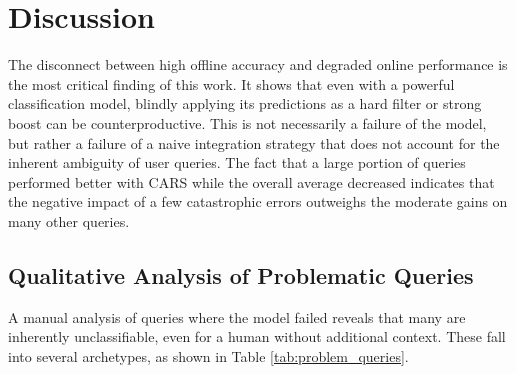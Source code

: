 \documentclass[12pt, a4paper]{article}
\begin{document}
\section{Discussion}

The disconnect between high offline accuracy and degraded online performance is the most critical finding of this work. It shows that even with a powerful classification model, blindly applying its predictions as a hard filter or strong boost can be counterproductive. This is not necessarily a failure of the model, but rather a failure of a naive integration strategy that does not account for the inherent ambiguity of user queries. The fact that a large portion of queries performed better with CARS while the overall average decreased indicates that the negative impact of a few catastrophic errors outweighs the moderate gains on many other queries.

\subsection{Qualitative Analysis of Problematic Queries}

A manual analysis of queries where the model failed reveals that many are inherently unclassifiable, even for a human without additional context. These fall into several archetypes, as shown in Table \ref{tab:problem_queries}.
\end{document}
